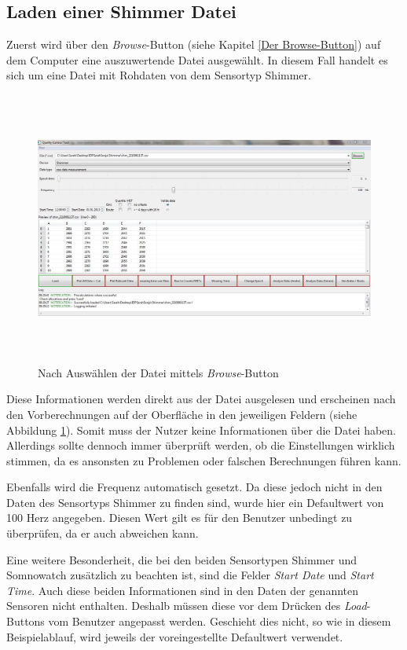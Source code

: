 \documentclass[onecolumn,german]{article}
\begin{document}
\subsection{Laden einer Shimmer Datei}

Zuerst wird über den \textit{Browse}-Button (siehe Kapitel \ref{Der Browse-Button}) auf dem Computer eine auszuwertende Datei ausgewählt. In diesem Fall handelt es sich um eine Datei mit Rohdaten von dem Sensortyp Shimmer.

\begin{figure}[H]
\centerline{
\includegraphics[width=160mm, height=90mm]{Abbildungen/Browse.JPG}
}
\caption {Nach Auswählen der Datei mittels \textit{Browse}-Button}
\label{browse}
\end{figure}

Diese Informationen werden direkt aus der Datei ausgelesen und erscheinen nach den Vorberechnungen auf der Oberfläche in den jeweiligen Feldern (siehe Abbildung \ref{browse}). Somit muss der Nutzer keine Informationen über die Datei haben. Allerdings sollte dennoch immer überprüft werden, ob die Einstellungen wirklich stimmen, da es ansonsten zu Problemen oder falschen Berechnungen führen kann.\newline

Ebenfalls wird die Frequenz automatisch gesetzt. Da diese jedoch nicht in den Daten des Sensortyps Shimmer zu finden sind, wurde hier ein Defaultwert von 100 Herz angegeben. Diesen Wert gilt es für den Benutzer unbedingt zu überprüfen, da er auch abweichen kann.\newline

Eine weitere Besonderheit, die bei den beiden Sensortypen Shimmer und Somnowatch zusätzlich zu beachten ist, sind die Felder \textit{Start Date} und \textit{Start Time}. Auch diese beiden Informationen sind in den Daten der genannten Sensoren nicht enthalten. Deshalb müssen diese vor dem Drücken des \textit{Load}-Buttons vom Benutzer angepasst werden. Geschieht dies nicht, so wie in diesem Beispielablauf, wird jeweils der voreingestellte Defaultwert verwendet.\newline
\end{document}
